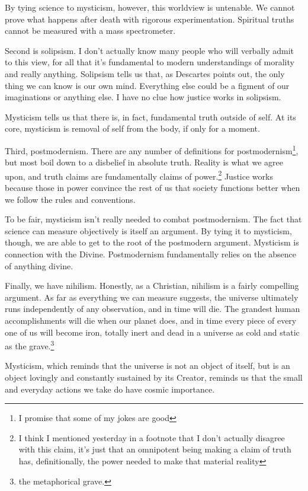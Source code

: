 \documentclass[12pt]{article}[titlepage]
\newcommand{\1}{\={a}}
\newcommand{\2}{\={e}}
\newcommand{\3}{\={\i}}
\newcommand{\4}{\=o}
\newcommand{\5}{\=u}
\newcommand{\6}{\={A}}
\renewcommand{\,}{\textsuperscript{,}}
\begin{document}
By tying science to mysticism, however, this worldview is untenable.
We cannot prove what happens after death with rigorous experimentation.
Spiritual truths cannot be measured with a mass spectrometer.

Second is solipsism.
I don't actually know many people who will verbally admit to this view, for all that it's fundamental to modern understandings of morality and really anything.
Solipsism tells us that, as Descartes points out, the only thing we can know is our own mind.
Everything else could be a figment of our imaginations or anything else.
I have no clue how justice works in solipsism.

Mysticism tells us that there is, in fact, fundamental truth outside of self.
At its core, mysticism is removal of self from the body, if only for a moment.

Third, postmodernism.
There are any number of definitions for postmodernism\footnote{I promise that some of my jokes are good}, but most boil down to a disbelief in absolute truth.
Reality is what we agree upon, and truth claims are fundamentally claims of power.\footnote{I think I mentioned yesterday in a footnote that I don't actually disagree with this claim, it's just that an omnipotent being making a claim of truth has, definitionally, the power needed to make that material reality}
Justice works because those in power convince the rest of us that society functions better when we follow the rules and conventions.

To be fair, mysticism isn't really needed to combat postmodernism.
The fact that science can measure objectively is itself an argument.
By tying it to mysticism, though, we are able to get to the root of the postmodern argument.
Mysticism is connection with the Divine.
Postmodernism fundamentally relies on the absence of anything divine.

Finally, we have nihilism.
Honestly, as a Christian, nihilism is a fairly compelling argument.
As far as everything we can measure suggests, the universe ultimately runs independently of any observation, and in time will die.
The grandest human accomplishments will die when our planet does, and in time every piece of every one of us will become iron, totally inert and dead in a universe as cold and static as the grave.\footnote{the metaphorical grave.}

Mysticism, which reminds that the universe is not an object of itself, but is an object lovingly and constantly sustained by its Creator, reminds us that the small and everyday actions we take do have cosmic importance.
\end{document}

